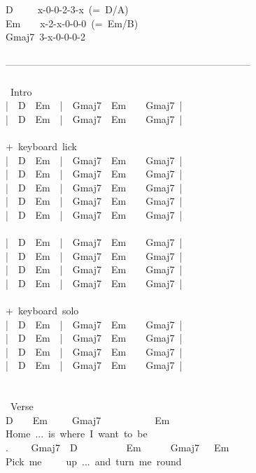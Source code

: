 {D\ \ \ \ \ x-0-0-2-3-x\ (=\ D/A)\\
Em\ \ \ \ x-2-x-0-0-0\ (=\ Em/B)\\
Gmaj7\ 3-x-0-0-0-2\\
\\
---------------------------------------------------------------------------\\
\\
\lbrack\ Intro\rbrack\\
|\ \ D\ \ Em\ \ |\ \ Gmaj7\ \ Em\ \ \ \ Gmaj7\ |\\
|\ \ D\ \ Em\ \ |\ \ Gmaj7\ \ Em\ \ \ \ Gmaj7\ |\\
\\
+\ keyboard\ lick\\
|\ \ D\ \ Em\ \ |\ \ Gmaj7\ \ Em\ \ \ \ Gmaj7\ |\\
|\ \ D\ \ Em\ \ |\ \ Gmaj7\ \ Em\ \ \ \ Gmaj7\ |\\
|\ \ D\ \ Em\ \ |\ \ Gmaj7\ \ Em\ \ \ \ Gmaj7\ |\\
|\ \ D\ \ Em\ \ |\ \ Gmaj7\ \ Em\ \ \ \ Gmaj7\ |\\
|\ \ D\ \ Em\ \ |\ \ Gmaj7\ \ Em\ \ \ \ Gmaj7\ |\\
\\
|\ \ D\ \ Em\ \ |\ \ Gmaj7\ \ Em\ \ \ \ Gmaj7\ |\\
|\ \ D\ \ Em\ \ |\ \ Gmaj7\ \ Em\ \ \ \ Gmaj7\ |\\
|\ \ D\ \ Em\ \ |\ \ Gmaj7\ \ Em\ \ \ \ Gmaj7\ |\\
|\ \ D\ \ Em\ \ |\ \ Gmaj7\ \ Em\ \ \ \ Gmaj7\ |\\
\\
+\ keyboard\ solo\\
|\ \ D\ \ Em\ \ |\ \ Gmaj7\ \ Em\ \ \ \ Gmaj7\ |\\
|\ \ D\ \ Em\ \ |\ \ Gmaj7\ \ Em\ \ \ \ Gmaj7\ |\\
|\ \ D\ \ Em\ \ |\ \ Gmaj7\ \ Em\ \ \ \ Gmaj7\ |\\
|\ \ D\ \ Em\ \ |\ \ Gmaj7\ \ Em\ \ \ \ Gmaj7\ |\\
\\
\\
\lbrack\ Verse\rbrack\\
D\ \ \ \ Em\ \ \ \ \ Gmaj7\ \ \ \ \ \ \ \ \ \ \ Em\\
Home\ ...\ is\ where\ I\ want\ to\ be\\
. \ \ \ \ Gmaj7\ \ D\ \ \ \ \ \ \ \ \ \ Em\ \ \ \ \ \ Gmaj7\ \ \ Em\\
Pick\ me\ \ \ \ \ up\ ...\ and\ turn\ me\ round\\
}
